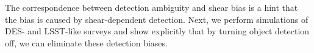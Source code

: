 \documentclass[fleqn,useAMS,usenatbib]{mnras}
\begin{document}
The correspondence between detection ambiguity and shear bias is a hint that
the bias is caused by shear-dependent detection. Next, we perform simulations
of DES- and LSST-like surveys and show explicitly that by turning object
detection off, we can eliminate these detection biases.






\end{document}

